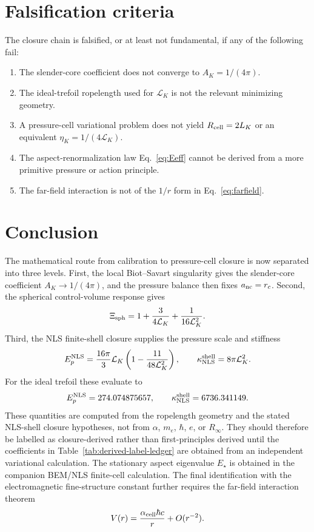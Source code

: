 \documentclass[11pt]{article}
\newcommand{\LK}{\mathcal L_K}
\newcommand{\EpNLS}{E_p^{\rm NLS}}
\newcommand{\kappaNLS}{\kappa_{\rm NLS}^{\rm shell}}
\begin{document}
\section{Falsification criteria}

The closure chain is falsified, or at least not fundamental, if any of the following fail:
\begin{enumerate}[label=(F\arabic*)]
\item The slender-core coefficient does not converge to \(A_K=1/(4\pi)\).
\item The ideal-trefoil ropelength used for \(\LK\) is not the relevant minimizing geometry.
\item A pressure-cell variational problem does not yield \(R_{\rm cell}=2L_K\) or an equivalent
      \(\eta_K=1/(4\LK)\).
\item The aspect-renormalization law Eq.~\eqref{eq:Eeff} cannot be derived from a more primitive
      pressure or action principle.
\item The far-field interaction is not of the \(1/r\) form in Eq.~\eqref{eq:farfield}.
\end{enumerate}

\section{Conclusion}

The mathematical route from calibration to pressure-cell closure is now separated into three
levels.  First, the local Biot--Savart singularity gives the slender-core coefficient
\(A_K\to1/(4\pi)\), and the pressure balance then fixes \(a_{\rm nc}=r_c\).  Second, the
spherical control-volume response gives
\[
  \Xi_{\rm sph}
  =
  1+\frac{3}{4\mathcal L_K}+\frac{1}{16\mathcal L_K^2}.
\]
Third, the NLS finite-shell closure supplies the pressure scale and stiffness
\[
  \EpNLS
  =
  \frac{16\pi}{3}\mathcal L_K
  \left(1-\frac{11}{48\mathcal L_K^2}\right),
  \qquad
  \kappaNLS=8\pi\mathcal L_K^2.
\]
For the ideal trefoil these evaluate to
\[
  \EpNLS=274.074875657,
  \qquad
  \kappaNLS=6736.341149.
\]
These quantities are computed from the ropelength geometry and the stated NLS-shell closure hypotheses, not from
\(\alpha\), \(m_e\), \(\hbar\), \(e\), or \(R_\infty\).  They should therefore be labelled as closure-derived rather than first-principles derived until the coefficients in Table~\ref{tab:derived-label-ledger} are obtained from an independent variational calculation.  The stationary aspect eigenvalue
\(E_\star\) is obtained in the companion BEM/NLS finite-cell calculation.  The final
identification with the electromagnetic fine-structure constant further requires the
far-field interaction theorem
\[
  V(r)=\frac{\alpha_{\rm cell}\hbar c}{r}+O(r^{-2}).
\]
\end{document}
